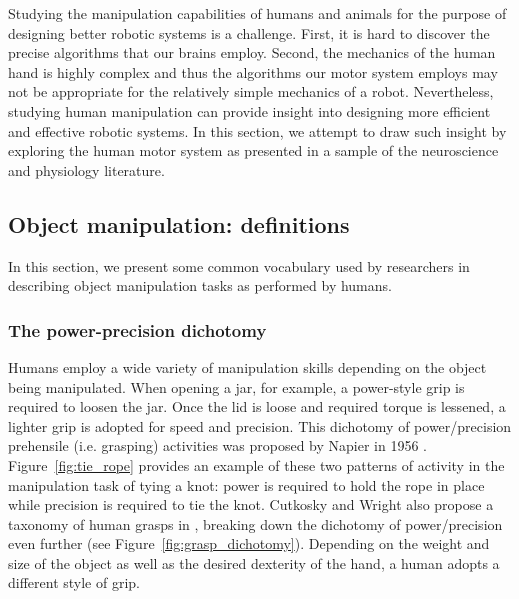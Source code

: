 Studying the manipulation capabilities of humans and animals for the purpose of designing better robotic systems is a challenge.
First, it is hard to discover the precise algorithms that our brains employ.
Second, the mechanics of the human hand is highly complex and thus the algorithms our motor system employs may not be appropriate for the relatively simple mechanics of a robot.
Nevertheless, studying human manipulation can provide insight into designing more efficient and effective robotic systems.
In this section, we attempt to draw such insight by exploring the human motor system as presented in a sample of the neuroscience and physiology literature.

\subsection{Object manipulation: definitions}

In this section, we present some common vocabulary used by researchers in describing object manipulation tasks as performed by humans.

\subsubsection*{The power-precision dichotomy}

Humans employ a wide variety of manipulation skills depending on the object being manipulated.
When opening a jar, for example, a power-style grip is required to loosen the jar.
Once the lid is loose and required torque is lessened, a lighter grip is adopted for speed and precision.
This dichotomy of power/precision prehensile (i.e. grasping) activities was proposed by Napier in 1956 \cite{napier1956prehensile}.
Figure~\ref{fig:tie_rope} provides an example of these two patterns of activity in the manipulation task of tying a knot: power is required to hold the rope in place while precision is required to tie the knot. 
Cutkosky and Wright also propose a taxonomy of human grasps in \cite{cutkosky1989grasp}, breaking down the dichotomy of power/precision even further (see Figure~\ref{fig:grasp_dichotomy}).
Depending on the weight and size of the object as well as the desired dexterity of the hand, a human adopts a different style of grip.

